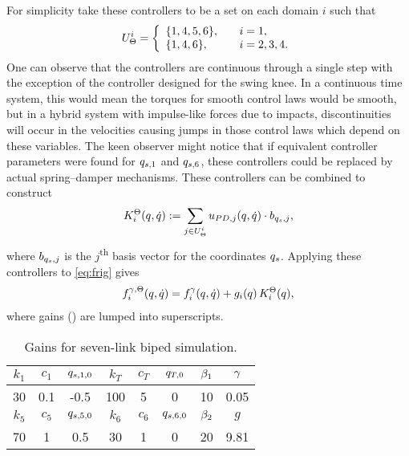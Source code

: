 For simplicity take these controllers to be a set on each domain $i$ such that
\begin{align*}
  U_{\gSD}^{i} = \left\{
    \begin{array}{l @{\hspace{2em}} l}
      \{1, 4, 5, 6\}, & i = 1,\\
      \{1, 4, 6\}, & i = 2, 3, 4.
    \end{array}\right.
\end{align*}
One can observe that the controllers are continuous through a single step with
the exception of the controller designed for the swing knee.
%
In a continuous time system, this would mean the torques for smooth control laws
would be smooth, but in a hybrid system with impulse-like forces due to impacts,
discontinuities will occur in the velocities causing jumps in those control laws
which depend on these variables.
%
The keen observer might notice that if equivalent controller parameters were
found for $q_{s,1}$ and $q_{s,6}$, these controllers could be replaced by actual
spring--damper mechanisms.
%
These controllers can be combined to construct
\begin{align*}
  K^{\Theta}_{i}(q, \dot{q}) := \sum_{j \in U_{\Theta}^{i}} u_{PD, j}(q, \dot{q})
  \cdot b_{q_{s}, j},
\end{align*}
where $b_{q_{s}, j}$ is the $j$\textsuperscript{th} basis vector for the coordinates $q_{s}$.
%
Applying these controllers to \eqref{eq:frig} gives
\begin{align}
  \label{eq:frigt}
  f_{i}^{\gamma, \Theta}(q, \dot{q}) = f_{i}^{\gamma}(q, \dot{q}) + g_{i}(q) \, K^{\Theta}_{i}(q),
\end{align}
where gains () are lumped into superscripts.

\begin{table}[t!]
  \begin{center}
    \caption{Gains for seven-link biped simulation.}
    \label{tab:pdgains}
    \begin{tabular}{|c|c|c|c|c|c|c|c|}
      \hline
      $k_{1}$ & $c_{1}$ & $q_{s,1, 0}$ & $k_{T}$ & $c_{T}$ & $q_{T, 0}$ &
      $\beta_{1}$ & $\gamma$\\
      \hline
      30 & 0.1 & -0.5 & 100 & 5 & 0 & 10 & 0.05 \\
      \hline \hline
      $k_{5}$ & $c_{5}$ & $q_{s,5, 0}$ & $k_{6}$ & $c_{6}$ & $q_{s,6, 0}$ &
      $\beta_{2}$ & $g$ \\
      \hline
      70 & 1 & 0.5 & 30 & 1 & 0 & 20 & 9.81\\
      \hline
    \end{tabular}
  \end{center}
\end{table}

